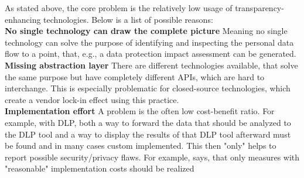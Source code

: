 


\graphicspath{{2/figures/}}

As stated above, the core problem is the relatively low usage of transparency-enhancing technologies. Below is a list of  possible reasons: \\

\noindent\textbf{No single technology can draw the complete picture} Meaning no single technology can solve the purpose of identifying and inspecting the personal data flow to a point, that, e.g., a data protection impact assessment can be generated.\\

\noindent\textbf{Missing abstraction layer} There are different technologies available, that solve the same purpose but have completely different APIs, which are hard to interchange. This is especially problematic for closed-source technologies, which create a vendor lock-in effect using this practice.\\

\noindent\textbf{Implementation effort} A problem is the often low cost-benefit ratio. For example, with DLP, both a way to forward the data that should be analyzed to the DLP tool and a way to display the results of that DLP tool afterward must be found and in many cases custom implemented. This then "only" helps to report possible security/privacy flaws. For example, \parencite[Art. 25]{noauthor_general_2016} says, that only measures with "reasonable" implementation costs should be realized

